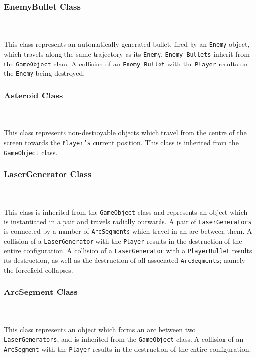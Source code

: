 \documentclass[10pt,twocolumn]{witseiepaper}
\begin{document}
\subsubsection{EnemyBullet Class}
~\\
~\\
This class represents an automatically generated bullet, fired by an \texttt{Enemy} object, which travels along the same trajectory as its \texttt{Enemy}. \texttt{Enemy Bullets} inherit from the \texttt{GameObject} class. A collision of an \texttt{Enemy Bullet} with the \texttt{Player} results on the \texttt{Enemy} being destroyed.

\subsubsection{Asteroid Class}
~\\
~\\
This class represents non-destroyable objects which travel from the centre of the screen towards the \texttt{Player's} current position. This class is inherited from the \texttt{GameObject} class. 

\subsubsection{LaserGenerator Class}
~\\
~\\
This class is inherited from the \texttt{GameObject} class and represents an object which is instantiated in a pair and travels radially outwards. A pair of \texttt{LaserGenerators} is connected by a number of \texttt{ArcSegments} which travel in an arc between them. A collision of a \texttt{LaserGenerator} with the \texttt{Player} results in the destruction of the entire configuration. A collision of a \texttt{LaserGenerator} with a \texttt{PlayerBullet} results its destruction, as well as the destruction of all associated \texttt{ArcSegments}; namely the forcefield collapses.

\subsubsection{ArcSegment Class}
~\\
~\\
This class represents an object which forms an arc between two \texttt{LaserGenerators}, and is inherited from the \texttt{GameObject} class. A collision of an \texttt{ArcSegment} with the \texttt{Player} results in the destruction of the entire configuration.
\end{document}
